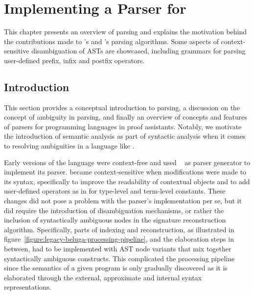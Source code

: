 \chapter{Implementing a Parser for \Beluga}\label{chapter:parsing-reimplementation}

This chapter presents an overview of parsing and explains the motivation behind the contributions made to \Beluga's and \Harpoon's parsing algorithms.
Some aspects of context-sensitive disambiguation of \acp{AST} are showcased, including grammars for parsing user-defined prefix, infix and postfix operators.

\section{Introduction}\label{section:parser-introduction}

This section provides a conceptual introduction to parsing, a discussion on the concept of ambiguity in parsing, and finally an overview of concepts and features of parsers for programming languages in proof assistants.
Notably, we motivate the introduction of semantic analysis as part of syntactic analysis when it comes to resolving ambiguities in a language like \Beluga.

Early versions of the \Beluga language were context-free and used \CamlpFour~\cite{de2003camlp4} as parser generator to implement its parser.
\Beluga became context-sensitive when modifications were made to its syntax, specifically to improve the readability of contextual objects and to add user-defined operators as in \Twelf for \LF type-level and term-level constants.
These changes did not pose a problem with the parser's implementation per se, but it did require the introduction of disambiguation mechanisms, or rather the inclusion of syntactically ambiguous nodes in the signature reconstruction algorithm.
Specifically, parts of indexing and reconstruction, as illustrated in figure~\ref{figure:legacy-beluga-processing-pipeline}, and the elaboration steps in between, had to be implemented with \ac{AST} node variants that mix together syntactically ambiguous constructs.
This complicated the processing pipeline since the semantics of a given \Beluga program is only gradually discovered as it is elaborated through the external, approximate and internal syntax representations.


